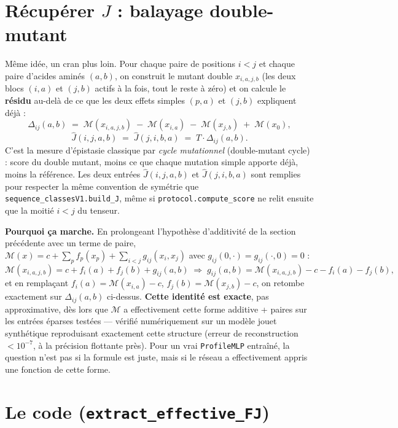 \documentclass[11pt,a4paper]{article}
\newcommand{\M}{\mathcal{M}}
\begin{document}
\section{Récupérer $J$ : balayage double-mutant}

Même idée, un cran plus loin. Pour chaque paire de positions $i<j$ et chaque paire d'acides
aminés $(a,b)$, on construit le mutant double $x_{i,a,j,b}$ (les deux blocs $(i,a)$ et $(j,b)$
actifs à la fois, tout le reste à zéro) et on calcule le \textbf{résidu} au-delà de ce que les
deux effets simples $(p,a)$ et $(j,b)$ expliquent déjà :
\[
    \Delta_{ij}(a,b) \;=\; \M(x_{i,a,j,b}) \;-\; \M(x_{i,a}) \;-\; \M(x_{j,b}) \;+\; \M(x_0),
\]
\[
    \hat J(i,j,a,b) \;=\; \hat J(j,i,b,a) \;=\; T\cdot \Delta_{ij}(a,b).
\]
C'est la mesure d'épistasie classique par \emph{cycle mutationnel} (double-mutant cycle) :
score du double mutant, moins ce que chaque mutation simple apporte déjà, moins la référence.
Les deux entrées $\hat J(i,j,a,b)$ et $\hat J(j,i,b,a)$ sont remplies pour respecter la même
convention de symétrie que \texttt{sequence\_classesV1.build\_J}, même si
\texttt{protocol.compute\_score} ne relit ensuite que la moitié $i<j$ du tenseur.

\textbf{Pourquoi ça marche.} En prolongeant l'hypothèse d'additivité de la section précédente
avec un terme de paire, $\M(x) = c + \sum_p f_p(x_p) + \sum_{i<j} g_{ij}(x_i,x_j)$ avec
$g_{ij}(0,\cdot)=g_{ij}(\cdot,0)=0$ :
\[
    \M(x_{i,a,j,b}) = c + f_i(a) + f_j(b) + g_{ij}(a,b)
    \;\Longrightarrow\;
    g_{ij}(a,b) = \M(x_{i,a,j,b}) - c - f_i(a) - f_j(b),
\]
et en remplaçant $f_i(a) = \M(x_{i,a})-c$, $f_j(b) = \M(x_{j,b})-c$, on retombe exactement sur
$\Delta_{ij}(a,b)$ ci-dessus. \textbf{Cette identité est exacte}, pas approximative, dès lors
que $\M$ a effectivement cette forme additive + paires sur les entrées éparses testées ---
vérifié numériquement sur un modèle jouet synthétique reproduisant exactement cette structure
(erreur de reconstruction $< 10^{-7}$, à la précision flottante près). Pour un vrai
\texttt{ProfileMLP} entraîné, la question n'est pas si la formule est juste, mais si le réseau
a effectivement appris une fonction de cette forme.

\section{Le code (\texttt{extract\_effective\_FJ})}
\end{document}
